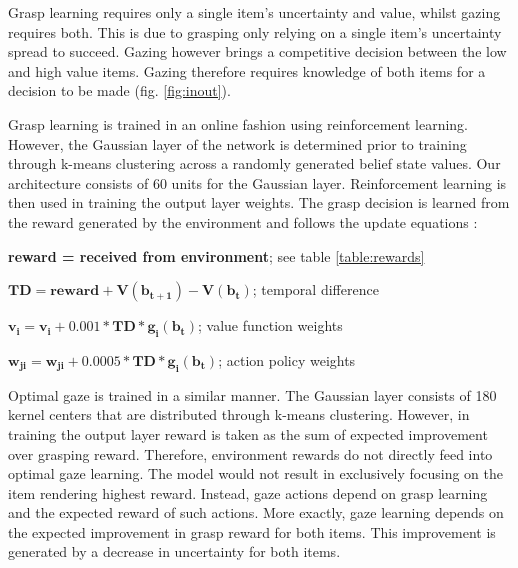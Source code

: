 \documentclass[11]{article}
\begin{document}
Grasp learning requires only a single item's uncertainty and value, whilst gazing requires both. 
This is due to grasping only relying on a single item's uncertainty spread to succeed.
Gazing however brings a competitive decision between the low and high value items.
Gazing therefore requires knowledge of both items for a decision to be made (fig. \ref{fig:inout}). 

Grasp learning is trained in an online fashion using reinforcement learning.
However, the Gaussian layer of the network is determined prior to training through k-means clustering across a randomly generated belief state values.
Our architecture consists of 60 units for the Gaussian layer. 
Reinforcement learning is then used in training the output layer weights.
The grasp decision is learned from the reward generated by the environment and follows the update equations : 

\begin{list}{}{}
  \item \textbf{reward = received from environment}; see table \ref{table:rewards}
  \item $\pmb{TD = reward + V(b_{t+1}) - V(b_t)}$; temporal difference
  \item $\pmb{v_i = v_i + 0.001 * TD * g_i(b_t)}$; value function weights
  \item $\pmb{w_{ji} = w_{ji}+ 0.0005 * TD * g_i(b_t)}$; action policy weights
\end{list}  

Optimal gaze is trained in a similar manner. 
The Gaussian layer consists of 180 kernel centers that are distributed through k-means clustering. 
However, in training the output layer reward is taken as the sum of expected improvement over grasping reward. 
Therefore, environment rewards do not directly feed into optimal gaze learning. 
The model would not result in exclusively focusing on the item rendering highest reward.
Instead, gaze actions depend on grasp learning and the expected reward of such actions.
More exactly, gaze learning depends on the expected improvement in grasp reward for both items.
This improvement is generated by a decrease in uncertainty for both items. 
\end{document}
